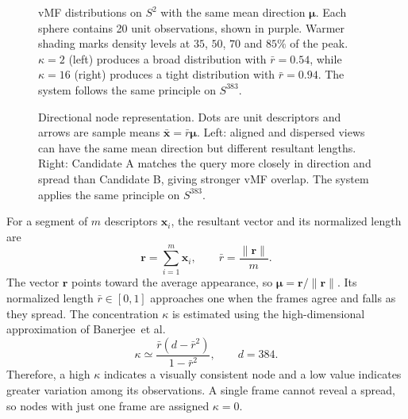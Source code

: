 \documentclass[5p,twocolumn,nonatbib,reversenotenum]{elsarticle}
\newcommand{\etalcite}[1]{et al.~\cite{#1}}
\begin{document}
\begin{figure}[!htbp]
    \centering
    
    \caption{vMF distributions on $S^2$ with the same mean direction $\boldsymbol{\mu}$. Each sphere contains 20 unit observations, shown in purple. Warmer shading marks density levels at $35$, $50$, $70$ and $85\%$ of the peak. $\kappa=2$ (left) produces a broad distribution with $\bar r=0.54$, while $\kappa=16$ (right) produces a tight distribution with $\bar r=0.94$. The system follows the same principle on $S^{383}$.}
    \label{fig:vmf_sphere}
\end{figure}

\begin{figure}[!t]
    \centering
    
    \caption{Directional node representation. Dots are unit descriptors and arrows are sample means $\bar{\mathbf{x}}=\bar r\boldsymbol{\mu}$. Left: aligned and dispersed views can have the same mean direction but different resultant lengths. Right: Candidate A matches the query more closely in direction and spread than Candidate B, giving stronger vMF overlap. The system applies the same principle on $S^{383}$.}
    \label{fig:vmf_model}
\end{figure}

For a segment of $m$ descriptors $\mathbf{x}_i$, the resultant vector and its normalized length are
\begin{equation}
    \mathbf{r}=\sum_{i=1}^{m}\mathbf{x}_i, \qquad
    \bar r=\frac{\lVert\mathbf{r}\rVert}{m}.
\end{equation}
The vector $\mathbf{r}$ points toward the average appearance, so $\boldsymbol{\mu}=\mathbf{r}/\lVert\mathbf{r}\rVert$. Its normalized length $\bar r\in[0,1]$ approaches one when the frames agree and falls as they spread. The concentration $\kappa$ is estimated using the high-dimensional approximation of Banerjee~\etalcite{Banerjee2005vMF}
\begin{equation}
    \kappa \simeq \frac{\bar r(d-\bar r^2)}{1-\bar r^2}, \qquad d=384.
\end{equation}
Therefore, a high $\kappa$ indicates a visually consistent node and a low value indicates greater variation among its observations. A single frame cannot reveal a spread, so nodes with just one frame are assigned $\kappa=0$.
\end{document}

